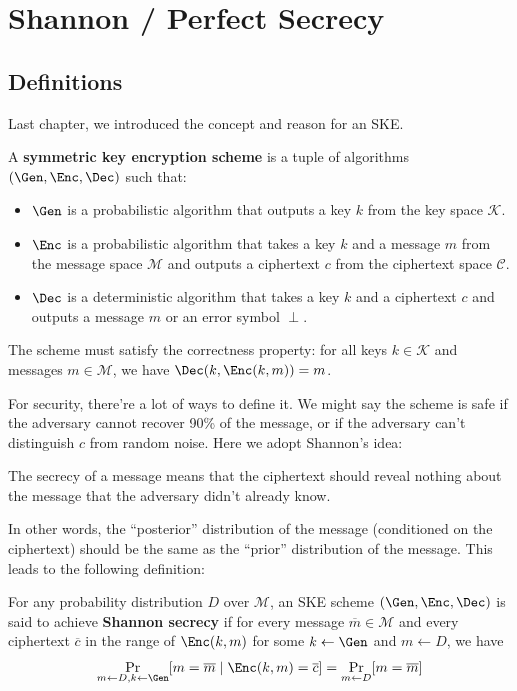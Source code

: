 \chapter{Shannon / Perfect Secrecy}

\section{Definitions}
Last chapter, we introduced the concept and reason for an SKE.

\begin{definition}
	A \textbf{symmetric key encryption scheme} is a tuple of algorithms $(\Gen, \Enc, \Dec)$ such that:
	\begin{itemize}
		\item $\Gen$ is a probabilistic algorithm that outputs a key $k$ from the key space $\mathcal{K}$.
		\item $\Enc$ is a probabilistic algorithm that takes a key $k$ and a message $m$ from the message space $\mathcal{M}$ and outputs a ciphertext $c$ from the ciphertext space $\mathcal{C}$.
		\item $\Dec$ is a deterministic algorithm that takes a key $k$ and a ciphertext $c$ and outputs a message $m$ or an error symbol $\perp$.
	\end{itemize}
	The scheme must satisfy the correctness property: for all keys $k \in \mathcal{K}$ and messages $m \in \mathcal{M}$, we have $\Dec(k, \Enc(k, m)) = m$.
\end{definition}

For security, there're a lot of ways to define it. We might say the scheme is safe if the adversary cannot recover 90\% of the message, or if the adversary can't distinguish $c$ from random noise.
Here we adopt Shannon's idea:

\begin{remark}
	The secrecy of a message means that the ciphertext should reveal nothing about the message that the adversary didn't already know.
\end{remark}

In other words, the ``posterior'' distribution of the message (conditioned on the ciphertext) should be the same as the ``prior'' distribution of the message. This leads to the following definition:

\begin{definition}
	For any probability distribution $D$ over $\mathcal{M}$, an SKE scheme $(\Gen, \Enc, \Dec)$ is said to achieve \textbf{Shannon secrecy} if for every message $\overline{m} \in \mathcal{M}$ and every ciphertext $\overline{c}$ in the range of $\Enc(k, m)$ for some $k \gets \Gen$ and $m \gets D$, we have
	\[
		\Pr_{m\gets D, k \gets \Gen}[m = \overline{m} \mid \Enc(k,m) = \overline{c}] = \Pr_{m \gets D}[m = \overline{m}]
	\]
\end{definition}

